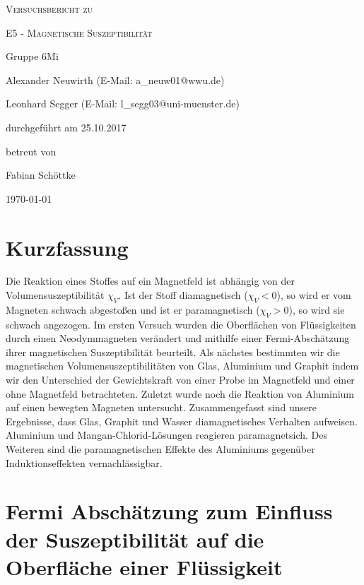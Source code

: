 \documentclass[
	a4paper,
	12pt,
	pagesize,
	ngerman
]{scrartcl}
\begin{document}
	
	\begin{titlepage}
		\centering
		{\scshape\LARGE Versuchsbericht zu \par}
		\vspace{1cm}
		{\scshape\huge E5 - Magnetische Suszeptibilität\par}
		\vspace{2.5cm}
		{\LARGE Gruppe 6Mi \par}
		\vspace{0.5cm}
		
		{\large Alexander Neuwirth (E-Mail: a\_neuw01@wwu.de) \par}
		{\large Leonhard Segger (E-Mail: l\_segg03@uni-muenster.de) \par}
		\vfill
		
		durchgeführt am 25.10.2017\par
		betreut von\par
		{\large Fabian Schöttke}
		
		\vfill
		
		{\large \today\par}
	\end{titlepage}
	\tableofcontents
	\newpage
	
	\section{Kurzfassung}
	Die Reaktion eines Stoffes auf ein Magnetfeld ist abhängig von der Volumensuszeptibilität $\chi_V$. Ist der Stoff diamagnetisch ($\chi_V<0$), so wird er vom Magneten schwach abgestoßen und ist er paramagnetisch ($\chi_V>0$), so wird sie schwach angezogen.\newline 
	Im ersten Versuch wurden die Oberflächen von Flüssigkeiten durch einen Neodymmagneten verändert und mithilfe einer Fermi-Abschätzung ihrer magnetischen Suszeptibilität beurteilt. 
	Als nächstes bestimmten wir die magnetischen Volumensuszeptibilitäten von Glas, Aluminium und Graphit indem wir den Unterschied der Gewichtskraft von einer Probe im Magnetfeld und einer ohne Magnetfeld betrachteten. 
	Zuletzt wurde noch die Reaktion von Aluminium auf einen bewegten Magneten untersucht.
	Zusammengefasst sind unsere Ergebnisse, dass Glas, Graphit und Wasser diamagnetisches Verhalten aufweisen. Aluminium und Mangan-Chlorid-Lösungen reagieren paramagnetsich. Des Weiteren sind die paramagnetischen Effekte des Aluminiums gegenüber Induktionseffekten vernachlässigbar. 
	
	\section{Fermi Abschätzung zum Einfluss der Suszeptibilität auf die Oberfläche einer Flüssigkeit}
\end{document}
